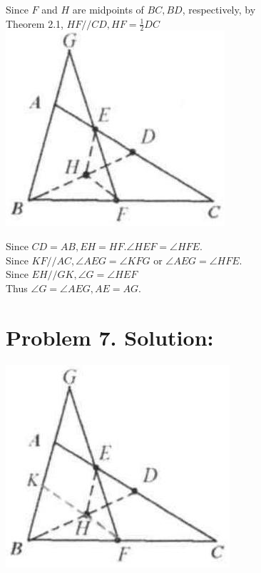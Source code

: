 \documentclass[10pt]{article}
\begin{document}
Since \(F\) and \(H\) are midpoints of \(B C, B D\), respectively, by\\
Theorem 2.1, \(H F / / C D, H F=\frac{1}{2} D C\)\\
\includegraphics[max width=\textwidth, center]{2025_04_17_97bc1f7e44d93c271a88g-050(1)}

Since \(C D=A B, E H=H F . \angle H E F=\angle H F E\).\\
Since \(K F / / A C, \angle A E G=\angle K F G\) or \(\angle A E G=\angle H F E\).\\
Since \(E H / / G K, \angle G=\angle H E F\)\\
Thus \(\angle G=\angle A E G, A E=A G\).

\section*{Problem 7. Solution:}
\begin{center}
\includegraphics[max width=\textwidth]{2025_04_17_97bc1f7e44d93c271a88g-050}
\end{center}
\end{document}
